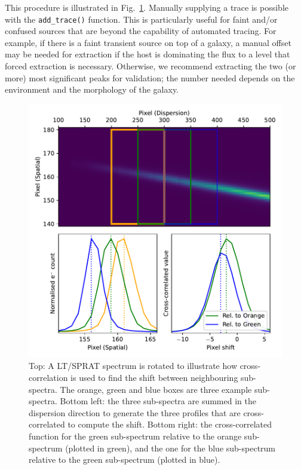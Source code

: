 \documentclass[twocolumn, linenumbers]{aastex631}
\begin{document}
This procedure is illustrated in Fig.~\ref{fig:trace}. Manually
supplying a trace is possible with the \texttt{add\_trace()}
function. This is particularly useful for faint and/or confused
sources that are beyond the capability of automated tracing. For
example, if there is a faint transient source on top of a galaxy,
a manual offset may be needed for extraction if the host is
dominating the flux to a level that forced extraction is necessary.
Otherwise, we recommend extracting the two (or more) most significant
peaks for validation; the number needed depends on
the environment and the morphology of the galaxy.

\begin{figure}
    \centering
    \includegraphics[width=\columnwidth]{fig_01_tracing.pdf}
    \caption{Top: A LT/SPRAT spectrum is rotated to illustrate how
    cross-correlation is used to find the shift between neighbouring
    sub-spectra. The orange, green and blue boxes are three example
    sub-spectra. Bottom left: the three sub-spectra are summed in
    the dispersion direction to generate the three profiles that are
    cross-correlated to compute the shift. Bottom right: the
    cross-correlated function for the green sub-spectrum relative
    to the orange sub-spectrum (plotted in green), and the one
    for the blue sub-spectrum relative to the green sub-spectrum
    (plotted in blue).}
    \label{fig:trace}
\end{figure}
\end{document}
